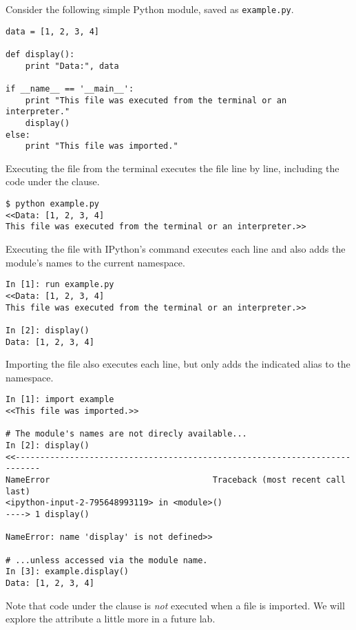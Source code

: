 Consider the following simple Python module, saved as \texttt{example.py}.

\begin{lstlisting}
data = [1, 2, 3, 4]

def display():
    print "Data:", data

if __name__ == '__main__':
    print "This file was executed from the terminal or an interpreter."
    display()
else:
    print "This file was imported."
\end{lstlisting}

Executing the file from the terminal executes the file line by line, including the code under the  clause.

\begin{lstlisting}
$ python example.py
<<Data: [1, 2, 3, 4]
This file was executed from the terminal or an interpreter.>>
\end{lstlisting}

Executing the file with IPython's  command executes each line and also adds the module's names to the current namespace.

\begin{lstlisting}
In [1]: run example.py
<<Data: [1, 2, 3, 4]
This file was executed from the terminal or an interpreter.>>

In [2]: display()
Data: [1, 2, 3, 4]
\end{lstlisting}

Importing the file also executes each line, but only adds the indicated alias to the namespace.

\begin{lstlisting}
In [1]: import example
<<This file was imported.>>

# The module's names are not direcly available...
In [2]: display()
<<---------------------------------------------------------------------------
NameError                                 Traceback (most recent call last)
<ipython-input-2-795648993119> in <module>()
----> 1 display()

NameError: name 'display' is not defined>>

# ...unless accessed via the module name.
In [3]: example.display()
Data: [1, 2, 3, 4]
\end{lstlisting}

Note that code under the  clause is \emph{not} executed when a file is imported.
We will explore the  attribute a little more in a future lab. %

